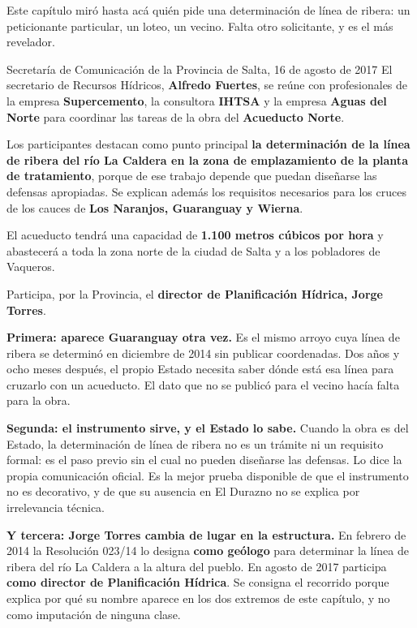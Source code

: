 Este capítulo miró hasta acá quién pide una determinación de línea de ribera: un
peticionante particular, un loteo, un vecino. Falta otro solicitante, y es el más
revelador.

\begin{ficha}{Secretaría de Comunicación de la Provincia de Salta, 16 de agosto de 2017}
El secretario de Recursos Hídricos, \textbf{Alfredo Fuertes}, se reúne con profesionales de la
empresa \textbf{Supercemento}, la consultora \textbf{IHTSA} y la empresa \textbf{Aguas del
Norte} para coordinar las tareas de la obra del \textbf{Acueducto Norte}.

Los participantes destacan como punto principal \textbf{la determinación de la línea de ribera
del río La Caldera en la zona de emplazamiento de la planta de tratamiento}, porque de ese
trabajo depende que puedan diseñarse las defensas apropiadas. Se explican además los
requisitos necesarios para los cruces de los cauces de \textbf{Los Naranjos, Guaranguay y
Wierna}.

El acueducto tendrá una capacidad de \textbf{1.100 metros cúbicos por hora} y abastecerá a
toda la zona norte de la ciudad de Salta y a los pobladores de Vaqueros.

Participa, por la Provincia, el \textbf{director de Planificación Hídrica, Jorge Torres}.
\end{ficha}

\textbf{Primera: aparece Guaranguay otra vez.} Es el mismo arroyo cuya línea de ribera se
determinó en diciembre de 2014 sin publicar coordenadas. Dos años y ocho meses después, el
propio Estado necesita saber dónde está esa línea para cruzarlo con un acueducto. El dato que
no se publicó para el vecino hacía falta para la obra.

\textbf{Segunda: el instrumento sirve, y el Estado lo sabe.} Cuando la obra es del Estado, la
determinación de línea de ribera no es un trámite ni un requisito formal: es el paso previo
sin el cual no pueden diseñarse las defensas. Lo dice la propia comunicación oficial. Es la
mejor prueba disponible de que el instrumento no es decorativo, y de que su ausencia en El
Durazno no se explica por irrelevancia técnica.

\textbf{Y tercera: Jorge Torres cambia de lugar en la estructura.} En febrero de 2014 la
Resolución 023/14 lo designa \textbf{como geólogo} para determinar la línea de ribera del río
La Caldera a la altura del pueblo. En agosto de 2017 participa \textbf{como director de
Planificación Hídrica}. Se consigna el recorrido porque explica por qué su nombre aparece en
los dos extremos de este capítulo, y no como imputación de ninguna clase.


